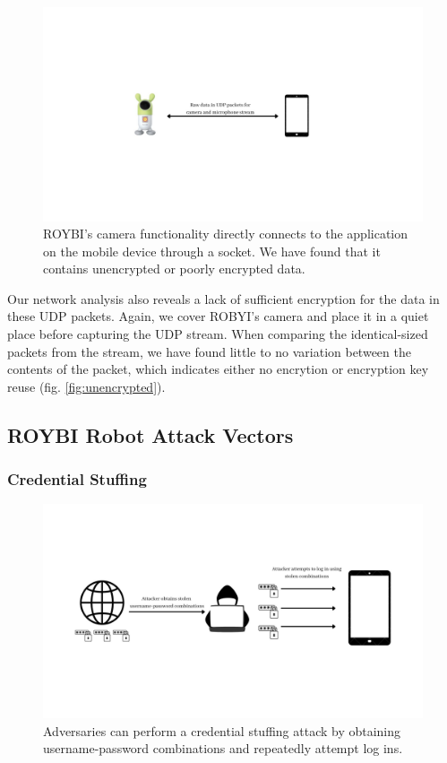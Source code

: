 \documentclass[12pt]{ucthesis}
\begin{document}
\begin{figure}
    \includegraphics[width=\textwidth]{udp.jpg}
    \caption{ROYBI's camera functionality directly connects to the application on the mobile device through a socket. We have found that it contains unencrypted or poorly encrypted data.}
    \label{fig:udp}
\end{figure}

Our network analysis also reveals a lack of sufficient encryption for the data in these UDP packets. Again, we cover ROBYI's camera and place it in a quiet place before capturing the UDP stream. When comparing the identical-sized packets from the stream, we have found little to no variation between the contents of the packet, which indicates either no encrytion or encryption key reuse (fig. \ref{fig:unencrypted}).

\subsection{ROYBI Robot Attack Vectors}

\subsubsection{Credential Stuffing}
\begin{figure}
    \includegraphics[width=\textwidth]{stuffing.jpg}
    \caption{Adversaries can perform a credential stuffing attack by obtaining username-password combinations and repeatedly attempt log ins.}
    \label{fig:stuffing}
\end{figure}
\end{document}
